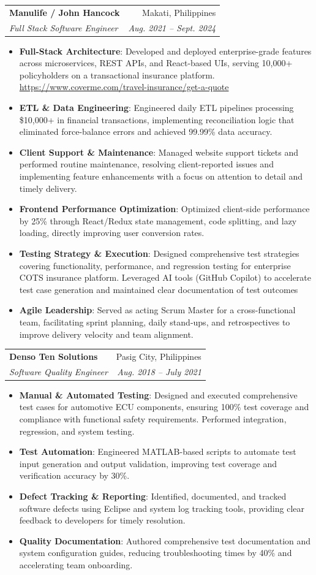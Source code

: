 \documentclass[letterpaper,11pt]{article}
\makeatletter
\newcommand{\resumeItem}[2]{
  \item\small{
    \textbf{#1}{: #2 \vspace{-2pt}}
  }
}
\newcommand{\resumeSubheading}[4]{
  \vspace{-1pt}\item
    \begin{tabular*}{0.97\textwidth}{l@{\extracolsep{\fill}}r}
      \textbf{#1} & #2 \\
      \textit{\small#3} & \textit{\small #4} \\
    \end{tabular*}\vspace{-5pt}
}
\newcommand{\resumeItemListStart}{\begin{itemize}}
\newcommand{\resumeItemListEnd}{\end{itemize}\vspace{-5pt}}
\makeatother
\begin{document}
    \resumeSubheading
      {Manulife / John Hancock}{Makati, Philippines}
      {Full Stack Software Engineer}{Aug. 2021 -- Sept. 2024}
      \resumeItemListStart
        \resumeItem{Full-Stack Architecture}
  {Developed and deployed enterprise-grade features across microservices, REST APIs, and React-based UIs, serving 10,000+ policyholders on a transactional insurance platform. \url{https://www.coverme.com/travel-insurance/get-a-quote}}
        \resumeItem{ETL \& Data Engineering}
  {Engineered daily ETL pipelines processing \$10,000+ in financial transactions, implementing reconciliation logic that eliminated force-balance errors and achieved 99.99\% data accuracy.}
        \resumeItem{Client Support \& Maintenance}
  {Managed website support tickets and performed routine maintenance, resolving client-reported issues and implementing feature enhancements with a focus on attention to detail and timely delivery.}
        \resumeItem{Frontend Performance Optimization}
  {Optimized client-side performance by 25\% through React/Redux state management, code splitting, and lazy loading, directly improving user conversion rates.}
        \resumeItem{Testing Strategy \& Execution}
  {Designed comprehensive test strategies covering functionality, performance, and regression testing for enterprise COTS insurance platform. Leveraged AI tools (GitHub Copilot) to accelerate test case generation and maintained clear documentation of test outcomes}
        \resumeItem{Agile Leadership}
  {Served as acting Scrum Master for a cross-functional team, facilitating sprint planning, daily stand-ups, and retrospectives to improve delivery velocity and team alignment.}
      \resumeItemListEnd

    \resumeSubheading
      {Denso Ten Solutions}{Pasig City, Philippines}
      {Software Quality Engineer}{Aug. 2018 -- July 2021}
      \resumeItemListStart
        \resumeItem{Manual \& Automated Testing}
  {Designed and executed comprehensive test cases for automotive ECU components, ensuring 100\% test coverage and compliance with functional safety requirements. Performed integration, regression, and system testing.}
\resumeItem{Test Automation}
  {Engineered MATLAB-based scripts to automate test input generation and output validation, improving test coverage and verification accuracy by 30\%.}
\resumeItem{Defect Tracking \& Reporting}
  {Identified, documented, and tracked software defects using Eclipse and system log tracking tools, providing clear feedback to developers for timely resolution.}
\resumeItem{Quality Documentation}
  {Authored comprehensive test documentation and system configuration guides, reducing troubleshooting times by 40\% and accelerating team onboarding.}
      \resumeItemListEnd
\end{document}
